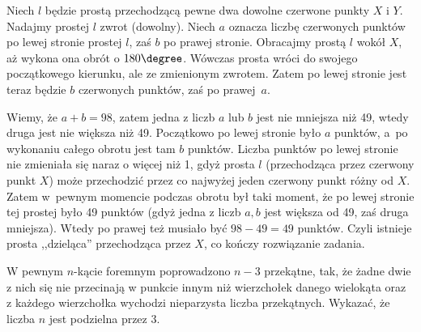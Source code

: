 \vspace{10px}
\noindent
Niech $l$ będzie prostą przechodzącą pewne dwa dowolne czerwone punkty $X$ i $Y$. Nadajmy prostej $l$ zwrot (dowolny). Niech $a$ oznacza liczbę czerwonych punktów po lewej stronie prostej $l$, zaś $b$ po prawej stronie. Obracajmy prostą $l$ wokół $X$, aż wykona ona obrót o $180\degree$. Wówczas prosta wróci do swojego początkowego kierunku, ale ze zmienionym zwrotem. Zatem po lewej stronie jest teraz będzie $b$ czerwonych punktów, zaś po prawej~$a$. 

\vspace{10px}
\noindent
Wiemy, że $a+b=98$, zatem jedna z liczb $a$ lub $b$ jest nie mniejsza niż 49, wtedy druga jest nie większa niż 49. Początkowo po lewej stronie było $a$ punktów, a~po wykonaniu całego obrotu jest tam $b$ punktów. Liczba punktów po lewej stronie nie zmieniała się naraz o więcej niż 1, gdyż prosta $l$ (przechodząca przez czerwony punkt $X$) może przechodzić przez co najwyżej jeden czerwony punkt różny od $X$. Zatem w~pewnym momencie podczas obrotu był taki moment, że po lewej stronie tej prostej było 49 punktów (gdyż jedna z liczb $a, b$ jest większa od 49, zaś druga mniejsza). Wtedy po prawej też musiało być $98-49=49$ punktów. Czyli istnieje prosta ,,dzieląca'' przechodząca przez $X$, co kończy rozwiązanie zadania.

 \vspace{5px}

 
\begin{problem}{5}
	W pewnym $n$-kącie foremnym poprowadzono $n - 3$ przekątne, tak, że żadne dwie z nich się nie przecinają w punkcie innym niż wierzchołek danego wielokąta oraz z każdego wierzchołka wychodzi nieparzysta liczba przekątnych. Wykazać, że liczba $n$ jest podzielna przez $3$.
\end{problem}


\begin{center}
\end{center}

